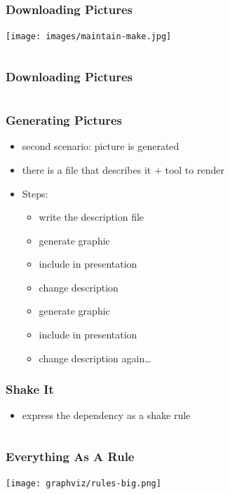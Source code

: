 \documentclass{beamer}
\begin{document}
\begin{frame}
  \frametitle{Downloading Pictures}
  \begin{center}
    \texttt{[image: images/maintain-make.jpg]}
    \inputminted{text}{images/maintain-make.src}
  \end{center}
\end{frame}

\begin{frame}
  \frametitle{Downloading Pictures}
    \begin{center}
    \inputminted{haskell}{snippets/download-images.hs}
  \end{center}
\end{frame}

\begin{frame}
  \frametitle{Generating Pictures}
  \begin{itemize}
  \item second scenario: picture is generated
  \item there is a file that describes it + tool to render
  \item Steps:
    \begin{itemize}
    \item write the description file
    \item generate graphic
    \item include in presentation
    \item change description
    \item generate graphic
    \item include in presentation
    \item change description again\ldots{}
    \end{itemize}
  \end{itemize}
\end{frame}

\begin{frame}
  \frametitle{Shake It}
  \begin{itemize}
  \item express the dependency as a shake rule
  \end{itemize}
  \inputminted{haskell}{snippets/graphviz-rule.hs}
\end{frame}

\begin{frame}
  \frametitle{Everything As A Rule}
  \begin{center}
    \texttt{[image: graphviz/rules-big.png]}
  \end{center}
\end{frame}
\end{document}
